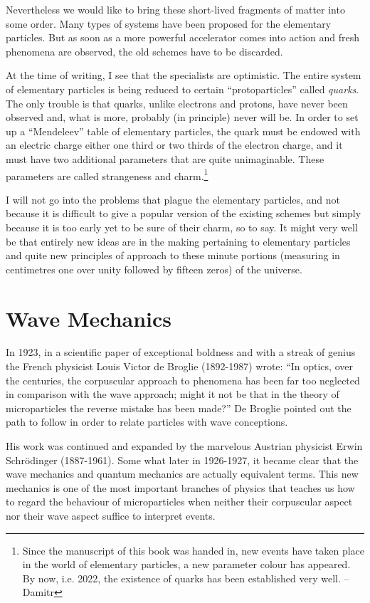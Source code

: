 Nevertheless we would like to bring these short-lived fragments of matter into some order. Many types of sys­tems have been proposed for the elementary particles. But as soon as a more powerful accelerator comes into action and fresh phenomena are observed, the old schemes have to be discarded.

At the time of writing, I see that the specialists are optimistic. The entire system of elementary particles is being reduced to certain ``protoparticles'' called \emph{quarks}. The only trouble is that quarks, unlike electrons and protons, have never been observed and, what is more, probably (in principle) never will be. In order to set up a ``Mendeleev'' table of elementary particles, the quark must be endowed with an electric charge either one third or two thirds of the electron charge, and it must have two additional parameters that are quite unimaginable. These parameters are called strangeness and charm.\footnote{Since the manuscript of this book was handed in, new events have taken place in the world of elementary particles, a new parameter colour has appeared. \textsf{\scriptsize By now, i.e. 2022, the existence of quarks has been established very well. -- Damitr}}

I will not go into the problems that plague the elementary particles, and not because it is difficult to give a popular version of the existing schemes but simply because it is too early yet to be sure of their charm, so to say. It might very well be that entirely new ideas are in the making pertaining to elementary particles and quite new principles of approach to these minute portions (measuring in centimetres one over unity followed by fifteen zeros) of the universe.

\section{Wave Mechanics}

In 1923, in a scientific paper of exceptional boldness and with a streak of genius the French physicist Louis Victor de Broglie (1892-1987) wrote: ``In optics, over the cen­turies, the corpuscular approach to phenomena has been far too neglected in comparison with the wave approach; might it not be that in the theory of microparticles the reverse mistake has been made?'' De Broglie pointed out the path to follow in order to relate particles with wave conceptions.

His work was continued and expanded by the marvelous Austrian physicist Erwin Schr\"odinger (1887-1961). Some­ what later in 1926-1927, it became clear that the wave mechanics and quantum mechanics are actually equivalent terms. This new mechanics is one of the most important branches of physics that teaches us how to regard the behaviour of microparticles when neither their corpuscular aspect nor their wave aspect suffice to inter­pret events.

